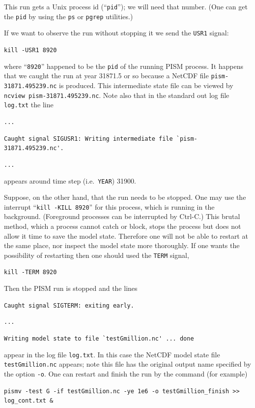 \documentclass[11pt,final]{amsart}
\begin{document}
\noindent This run gets a Unix process id (``\verb|pid|''); we will need that number.  (One can get the \verb|pid| by using the \verb|ps| or \verb|pgrep| utilities.)

If we want to observe the run without stopping it we send the \verb|USR1| signal:

\verb|kill -USR1 8920|

\noindent where ``\verb|8920|'' happened to be the \verb|pid| of the running PISM process.  It happens that we caught the run at year 31871.5 or so because a NetCDF file \verb|pism-31871.495239.nc| is produced.  This intermediate state file can be viewed by \verb|ncview pism-31871.495239.nc|.  Note also that in the standard out log file \verb|log.txt| the line

\verb|...|

\verb|Caught signal SIGUSR1: Writing intermediate file `pism-31871.495239.nc'.|

\verb|...|

\noindent appears around time step (i.e.~\verb|YEAR|) 31900.

Suppose, on the other hand, that the run needs to be stopped.  One may use the interrupt ``\verb|kill -KILL 8920|'' for this process, which is running in the background.  (Foreground processes can be interrupted by Ctrl-C.)  This brutal method, which a process cannot catch or block, stops the process but does not allow it  time to save the model state.  Therefore one will not be able to restart at the same place, nor inspect the model state more thoroughly.  If one wants the possibility of restarting then one should used the \verb|TERM| signal,

\verb|kill -TERM 8920|

\noindent Then the PISM run is stopped and the lines

\verb|Caught signal SIGTERM: exiting early.|

\verb|...|

\verb|Writing model state to file `testGmillion.nc' ... done|

\noindent appear in the log file \verb|log.txt|.  In this case the NetCDF model state file \verb|testGmillion.nc| appears; note this file has the original output name specified by the option \verb|-o|.  One can restart and finish the run by the command (for example)

\verb|pismv -test G -if testGmillion.nc -ye 1e6 -o testGmillion_finish >> log_cont.txt &|
\smallskip
\end{document}
